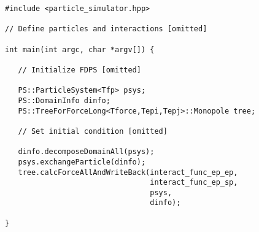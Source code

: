 \documentclass[10pt,twocolumn,a4paper,fleqn]{article}
\begin{document}

\begin{mdframed}[
    backgroundcolor=bg,
    topline=false,
    bottomline=false,
    leftline=false,
    rightline=false]
\begin{verbatim}
#include <particle_simulator.hpp>

// Define particles and interactions [omitted]

int main(int argc, char *argv[]) {

   // Initialize FDPS [omitted]

   PS::ParticleSystem<Tfp> psys;
   PS::DomainInfo dinfo;
   PS::TreeForForceLong<Tforce,Tepi,Tepj>::Monopole tree;
   
   // Set initial condition [omitted]
   
   dinfo.decomposeDomainAll(psys);
   psys.exchangeParticle(dinfo);
   tree.calcForceAllAndWriteBack(interact_func_ep_ep,
                                 interact_func_ep_sp,
                                 psys,
                                 dinfo);
  
}
\end{verbatim}
\end{mdframed}



\end{document}
